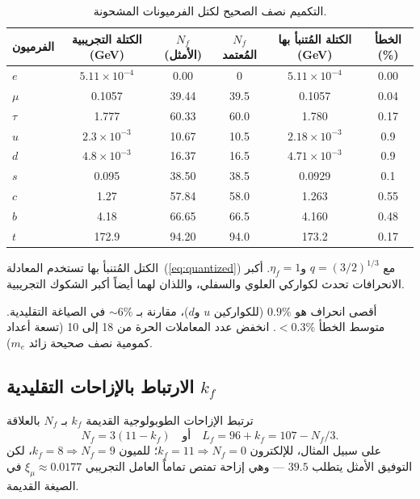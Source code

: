 \documentclass[12pt,a4paper]{article}
\begin{document}
	\begin{otherlanguage}{english}   %
		\begin{table}[htbp]
			\centering
			\caption{التكميم نصف الصحيح لكتل الفرميونات المشحونة.}
			\label{tab:masses}
			\begin{tabular}{l c c c c c}
				\toprule
				الفرميون & الكتلة التجريبية (GeV) & \(N_f\) (الأمثل) & \(N_f\) المُعتمد & الكتلة المُتنبأ بها (GeV) & الخطأ (\%) \\
				\midrule
				\(e\)   & \(5.11\times10^{-4}\) & 0.00  & 0      & \(5.11\times10^{-4}\) & 0.00 \\
				\(\mu\)  & 0.1057                & 39.44 & 39.5   & 0.1057               & 0.04 \\
				\(\tau\) & 1.777                 & 60.33 & 60.0   & 1.780                & 0.17 \\
				\(u\)   & \(2.3\times10^{-3}\)   & 10.67 & 10.5   & \(2.18\times10^{-3}\) & 0.9 \\
				\(d\)   & \(4.8\times10^{-3}\)   & 16.37 & 16.5   & \(4.71\times10^{-3}\) & 0.9 \\
				\(s\)   & 0.095                 & 38.50 & 38.5   & 0.0929               & 0.1 \\
				\(c\)   & 1.27                  & 57.84 & 58.0   & 1.263                & 0.55 \\
				\(b\)   & 4.18                  & 66.65 & 66.5   & 4.160                & 0.48 \\
				\(t\)   & 172.9                 & 94.20 & 94.0   & 173.2                & 0.17 \\
				\bottomrule
			\end{tabular}
			\par\smallskip
			\footnotesize
			الكتل المُتنبأ بها تستخدم المعادلة~(\ref{eq:quantized}) مع \(q = (3/2)^{1/3}\) و\(\eta_f = 1\). أكبر الانحرافات تحدث لكواركي العلوي والسفلي، واللذان لهما أيضاً أكبر الشكوك التجريبية.
		\end{table}
	\end{otherlanguage}
	
	أقصى انحراف هو \(0.9\%\) (للكواركين \(u\) و\(d\))، مقارنة بـ \(\sim 6\%\) في الصياغة التقليدية. متوسط الخطأ \(<0.3\%\). انخفض عدد المعاملات الحرة من 18 إلى 10 (تسعة أعداد كمومية نصف صحيحة زائد \(m_e\)).
	
	\subsection{الارتباط بالإزاحات التقليدية \(k_f\)}
	ترتبط الإزاحات الطوبولوجية القديمة \(k_f\) بـ \(N_f\) بالعلاقة
	\begin{equation}
		N_f = 3(11 - k_f) \quad \text{أو} \quad L_f = 96 + k_f = 107 - N_f/3.
	\end{equation}
	على سبيل المثال، للإلكترون \(k_f = 11 \Rightarrow N_f = 0\)؛ للميون \(k_f = 8 \Rightarrow N_f = 9\)، لكن التوفيق الأمثل يتطلب \(39.5\) — وهي إزاحة تمتص تماماً العامل التجريبي \(\xi_\mu \approx 0.0177\) في الصيغة القديمة.
	
\end{document}

